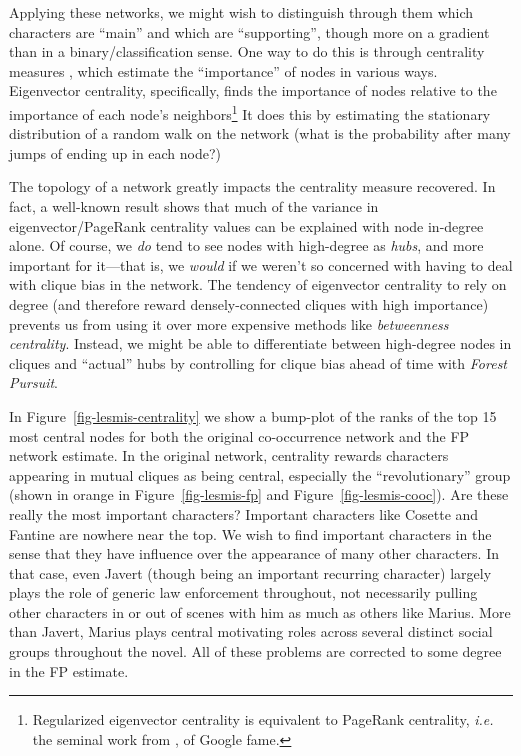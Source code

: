 \documentclass[%
	12pt,
		oneside,
		letterpaper
]{book}
\begin{document}
Applying these networks, we might wish to distinguish through them which
characters are ``main'' and which are ``supporting'', though more on a
gradient than in a binary/classification sense. One way to do this is
through centrality measures
\autocite{Mathematicsnetworks_Newman2018,atlasaspiringnetwork_Coscia2021},
which estimate the ``importance'' of nodes in various ways. Eigenvector
centrality, specifically, finds the importance of nodes relative to the
importance of each node's neighbors\footnote{ Regularized eigenvector
  centrality is equivalent to PageRank centrality, \emph{i.e.} the
  seminal work from \autocite{PageRankCitationRanking_Page1999}, of
  Google fame.} It does this by estimating the stationary distribution
of a random walk on the network (what is the probability after many
jumps of ending up in each node?)

The topology of a network greatly impacts the centrality measure
recovered. In fact, a well-known result shows that much of the variance
in eigenvector/PageRank centrality values can be explained with node
in-degree alone.\autocite{ApproximatingPageRankDegree_Fortunato} Of
course, we \emph{do} tend to see nodes with high-degree as \emph{hubs},
and more important for it---that is, we \emph{would} if we weren't so
concerned with having to deal with clique bias in the network. The
tendency of eigenvector centrality to rely on degree (and therefore
reward densely-connected cliques with high importance) prevents us from
using it over more expensive methods like \emph{betweenness centrality}.
Instead, we might be able to differentiate between high-degree nodes in
cliques and ``actual'' hubs by controlling for clique bias ahead of time
with \emph{Forest Pursuit}.

In Figure~\ref{fig-lesmis-centrality} we show a bump-plot of the ranks
of the top 15 most central nodes for both the original co-occurrence
network and the FP network estimate. In the original network, centrality
rewards characters appearing in mutual cliques as being central,
especially the ``revolutionary'' group (shown in orange in
Figure~\ref{fig-lesmis-fp} and Figure~\ref{fig-lesmis-cooc}). Are these
really the most important characters? Important characters like Cosette
and Fantine are nowhere near the top. We wish to find important
characters in the sense that they have influence over the appearance of
many other characters. In that case, even Javert (though being an
important recurring character) largely plays the role of generic law
enforcement throughout, not necessarily pulling other characters in or
out of scenes with him as much as others like Marius. More than Javert,
Marius plays central motivating roles across several distinct social
groups throughout the novel. All of these problems are corrected to some
degree in the FP estimate.
\end{document}
